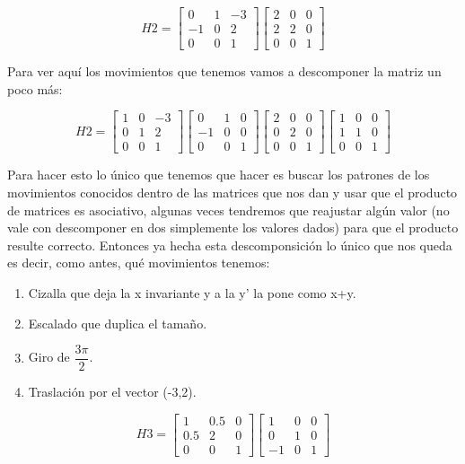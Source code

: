 \documentclass[10pt,a4paper]{article}
\begin{document}
\[H2 = 
\begin{bmatrix}
0&1&-3\\
-1&0&2\\
0&0&1
\end{bmatrix}
\begin{bmatrix}
2&0&0\\
2&2&0\\
0&0&1
\end{bmatrix}
\]

Para ver aquí los movimientos que tenemos vamos a descomponer la matriz un poco más:

\[H2 = 
\begin{bmatrix}
1&0&-3\\
0&1&2\\
0&0&1
\end{bmatrix}
\begin{bmatrix}
0&1&0\\
-1&0&0\\
0&0&1
\end{bmatrix}
\begin{bmatrix}
2&0&0\\
0&2&0\\
0&0&1
\end{bmatrix}
\begin{bmatrix}
1&0&0\\
1&1&0\\
0&0&1
\end{bmatrix}
\]

Para hacer esto lo único que tenemos que hacer es buscar los patrones de los movimientos conocidos dentro de las matrices que nos dan y usar que el producto de matrices es asociativo, algunas veces tendremos que reajustar algún valor (no vale con descomponer en dos simplemente los valores dados) para que el producto resulte correcto. Entonces ya hecha esta descomponsición lo único que nos queda es decir, como antes, qué movimientos tenemos:\\

\begin{enumerate}
\item Cizalla que deja la x invariante y a la y' la pone como x+y.
\item Escalado que duplica el tamaño.
\item Giro de $\dfrac{3\pi}{2}$.
\item Traslación por el vector (-3,2).
\end{enumerate}

\[H3 = 
\begin{bmatrix}
1&0.5&0\\
0.5&2&0\\
0&0&1
\end{bmatrix}
\begin{bmatrix}
1&0&0\\
0&1&0\\
-1&0&1
\end{bmatrix}
\]
\end{document}
